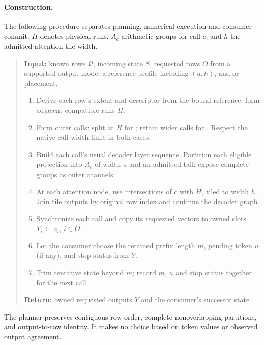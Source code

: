 \paragraph{Construction.}
The following procedure separates planning, numerical execution and consumer commit. $H$ denotes physical runs, $A_c$ arithmetic groups for call $c$, and $h$ the admitted attention tile width.
\begin{quote}\small
\textbf{Input:} known rows $\mathcal{Q}$, incoming state $S$, requested rows $O$ from a supported output mode, a reference profile including $(a,h)$, and \Simple{} or \Local{} placement.
\begin{enumerate}[label=\arabic*.,leftmargin=1.6em]
 \item Derive each row's extent and descriptor from the bound reference; form adjacent compatible runs $H$.
 \item Form outer calls: split at $H$ for \Simple; retain wider calls for \Local. Respect the native call-width limit in both cases.
 \item Build each call's usual decoder layer sequence. Partition each eligible projection into $A_c$ of width $a$ and an admitted tail; expose complete groups as outer channels.
 \item At each attention node, use intersections of $c$ with $H$, tiled to width $h$. Join tile outputs by original row index and continue the decoder graph.
 \item Synchronize each call and copy its requested vectors to owned slots $Y_i\gets z_i$, $i\in O$.
 \item Let the consumer choose the retained prefix length $m$, pending token $u$ (if any), and stop status from $Y$.
 \item Trim tentative state beyond $m$; record $m$, $u$ and stop status together for the next call.
\end{enumerate}
\textbf{Return:} owned requested outputs $Y$ and the consumer's successor state.
\end{quote}
The planner preserves contiguous row order, complete nonoverlapping partitions, and output-to-row identity. It makes no choice based on token values or observed output agreement.


